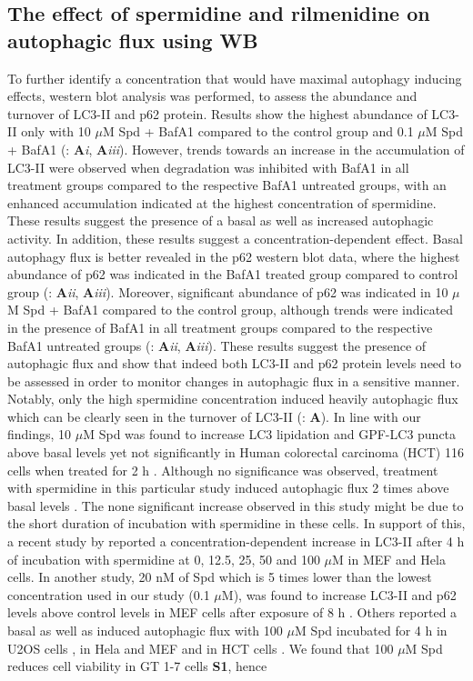 \subsection{The effect of spermidine and rilmenidine on autophagic flux using WB}
To further identify a concentration that would have maximal autophagy inducing effects, western blot analysis was performed, to assess the abundance and turnover of LC3-II and p62 protein. Results show the highest abundance of LC3-II only with 10 $\mu$M Spd + BafA1 compared to the control group and 0.1 $\mu$M Spd + BafA1 (: \textbf{A}\textit{i}, \textbf{A}\textit{iii}). However, trends towards an increase in the accumulation of LC3-II were observed when degradation was inhibited with BafA1 in all treatment groups compared to the respective BafA1 untreated groups, with an enhanced accumulation indicated at the highest concentration of spermidine. These results suggest the presence of a basal as well as increased autophagic activity. In addition, these results suggest a concentration-dependent effect. Basal autophagy flux is better revealed in the p62 western blot data, where the highest abundance of p62 was indicated in the BafA1 treated group compared to control group (: \textbf{A}\textit{ii}, \textbf{A}\textit{iii}). Moreover, significant abundance of p62 was indicated in 10 $\mu$M Spd + BafA1 compared to the control group, although trends were indicated in the presence of BafA1 in all treatment groups compared to the respective BafA1 untreated groups (: \textbf{A}\textit{ii}, \textbf{A}\textit{iii}). These results suggest the presence of autophagic flux and show that indeed both LC3-II and p62 protein levels need to be assessed in order to monitor changes in autophagic flux in a sensitive manner. Notably, only the high spermidine concentration induced heavily autophagic flux which can be clearly seen in the turnover of LC3-II (: \textbf{A}). In line with our findings, 10 $\mu$M Spd was found to increase LC3 lipidation and GPF-LC3 puncta above  basal levels yet not significantly in Human colorectal carcinoma (HCT) 116 cells when treated for 2 h \citep{Morselli2011}. Although no significance was observed, treatment with spermidine in this particular study induced autophagic flux 2 times above basal levels \citep{Morselli2011}. The none significant increase observed in this study might be due to the short duration of incubation with spermidine in these cells. In support of this, a recent study by \citet{Yue2017} reported a concentration-dependent increase in LC3-II after 4 h of incubation with spermidine at  0, 12.5, 25, 50 and 100 $\mu$M in MEF and Hela cells.  In another study, 20 nM of Spd which is 5 times lower than the lowest concentration used in our study (0.1 $\mu$M), was found to increase LC3-II and p62 levels above control levels in MEF cells after exposure of 8 h \citep{DuToit2018a}. Others reported a basal as well as induced autophagic flux with 100 $\mu$M Spd incubated for 4 h in U2OS cells  \citep{Pietrocola2015}, in Hela and MEF \citep{Yue2017} and in HCT cells \citep{Morselli2011}. We found that 100 $\mu$M Spd reduces cell viability in GT 1-7 cells \textbf{S1}, hence 